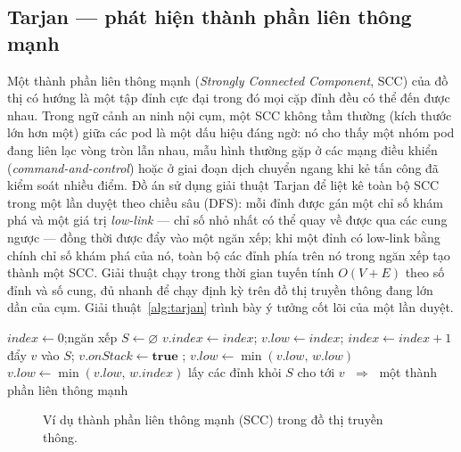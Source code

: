\subsection{Tarjan --- phát hiện thành phần liên thông mạnh}

Một thành phần liên thông mạnh (\textit{Strongly Connected Component}, SCC) của đồ
thị có hướng là một tập đỉnh cực đại trong đó mọi cặp đỉnh đều có thể đến được nhau.
Trong ngữ cảnh an ninh nội cụm, một SCC không tầm thường (kích thước lớn hơn một)
giữa các pod là một dấu hiệu đáng ngờ: nó cho thấy một nhóm pod đang liên lạc vòng
tròn lẫn nhau, mẫu hình thường gặp ở các mạng điều khiển (\textit{command-and-control})
hoặc ở giai đoạn dịch chuyển ngang khi kẻ tấn công đã kiểm soát nhiều điểm. Đồ án sử
dụng giải thuật Tarjan \cite{tarjan1972depth} để liệt kê toàn bộ SCC trong một lần
duyệt theo chiều sâu (DFS): mỗi đỉnh được gán một chỉ số khám phá và một giá trị
\textit{low-link} --- chỉ số nhỏ nhất có thể quay về được qua các cung ngược --- đồng
thời được đẩy vào một ngăn xếp; khi một đỉnh có low-link bằng chính chỉ số khám phá
của nó, toàn bộ các đỉnh phía trên nó trong ngăn xếp tạo thành một SCC. Giải thuật
chạy trong thời gian tuyến tính $O(V+E)$ theo số đỉnh và số cung, đủ nhanh để chạy
định kỳ trên đồ thị truyền thông đang lớn dần của cụm. Giải thuật~\ref{alg:tarjan}
trình bày ý tưởng cốt lõi của một lần duyệt.

\begin{algorithm}[H]
\caption{Tarjan --- liệt kê thành phần liên thông mạnh}
\label{alg:tarjan}
\begin{algorithmic}[1]
\State $index \gets 0$;\quad ngăn xếp $S \gets \varnothing$
  \State $v.index \gets index$;\; $v.low \gets index$;\; $index \gets index + 1$
  \State đẩy $v$ vào $S$;\; $v.onStack \gets \mathbf{true}$
      \State {};\; $v.low \gets \min(v.low,\, w.low)$
      \State $v.low \gets \min(v.low,\, w.index)$
    \EndIf
  \EndFor
    \State lấy các đỉnh khỏi $S$ cho tới $v$ $\;\Rightarrow\;$ một thành phần liên thông mạnh
  \EndIf
\EndFunction
\end{algorithmic}
\end{algorithm}

\begin{figure}[H]
  \centering
  \resizebox{0.62\linewidth}{!}{}
  \caption{Ví dụ thành phần liên thông mạnh (SCC) trong đồ thị truyền thông.}
  \label{fig:tarjan-ex}
\end{figure}


